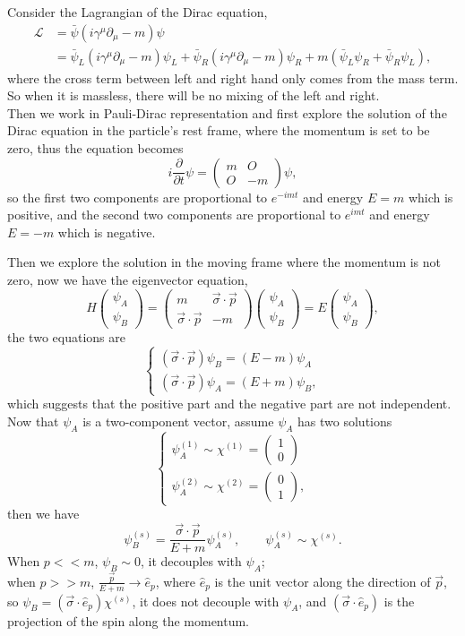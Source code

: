 \documentclass{article}
\newcommand{\be}{\begin{equation}}
\newcommand{\ee}{\end{equation}}
\newcommand{\ba}{\begin{array}}
\newcommand{\ea}{\end{array}}
\newcommand{\p}{\partial}
\newcommand{\1}{\left}
\newcommand{\2}{\right}
\newcommand{\ma}{\mathcal}
\newcommand{\m}{\mu}
\newcommand{\sig}{\sigma}
\begin{document}
Consider the Lagrangian of the Dirac equation,
\be\begin{split}
\ma L&=\bar\psi(i\gamma^\m \p_\m-m)\psi\\
&=\bar\psi_L(i\gamma^\m \p_\m-m)\psi_L+\bar\psi_R(i\gamma^\m \p_\m-m)\psi_R+m(\bar\psi_L \psi_R+\bar\psi_R \psi_L),
\end{split}\ee
where the cross term between left and right hand only comes from the mass term. So when it is massless, there will be no mixing of the left and right.\\





Then we work in Pauli-Dirac representation and first explore the solution of the Dirac equation in the particle's rest frame, where the momentum is set to be zero, thus the equation becomes
\be
i\frac\p{\p t}\psi=\1(\ba{cc}m&O\\O&-m\ea\2)  \psi,
\ee
so the first two components are proportional to $e^{-imt}$ and energy $E=m$ which is positive, and the second two components are proportional to $e^{imt}$ and energy $E=-m$ which is negative.

Then we explore the solution in the moving frame where the momentum is not zero, now we have the eigenvector equation,
\be
H\1(\ba{c}\psi_A\\\psi_B\ea\2)=\1(\ba{cc}m&\vec\sig\cdot\vec p\\\vec\sig\cdot\vec p&-m\ea\2) \1(\ba{c}\psi_A\\\psi_B\ea\2)=E\1(\ba{c}\psi_A\\\psi_B\ea\2),
\ee
the two equations are
\be\1\{\begin{split}
(\vec\sig\cdot\vec p)\psi_B=(E-m)\psi_A\\
(\vec\sig\cdot\vec p)\psi_A=(E+m)\psi_B,
\end{split}\2.\ee
which suggests that the positive part and the negative part are not independent.\\
Now that $\psi_A$ is a two-component vector, assume $\psi_A$ has two solutions
\be\1\{\begin{split}
\psi_A^{(1)}\sim\chi^{(1)}=\1(\ba{c}1\\0\ea\2)\\
\psi_A^{(2)}\sim\chi^{(2)}=\1(\ba{c}0\\1\ea\2),
\end{split}\2.\ee
then we have
\be
\psi_B^{(s)}=\frac{\vec\sig\cdot\vec p}{E+m}\psi_A^{(s)}, \qquad\psi_A^{(s)}\sim\chi^{(s)}.
\ee
When $p<<m$, $\psi_B\sim0$, it decouples with $\psi_A$;\\
when $p>>m$, $\frac{\vec p}{E+m}\rightarrow \hat e_p$, where $\hat e_p$ is the unit vector along the direction of $\vec p$, so $\psi_B=(\vec\sig\cdot\hat e_p) \chi^{(s)}$, it does not decouple with $\psi_A$, and $(\vec\sig\cdot\hat e_p)$ is the projection of the spin along the momentum.
\end{document}
